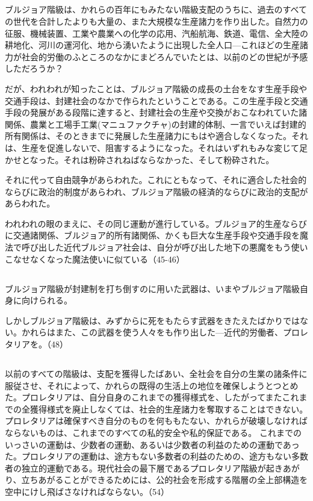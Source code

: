 \subsection{}



ブルジョア階級は、かれらの百年にもみたない階級支配のうちに、過去のすべての世代を合計したよりも大量の、また大規模な生産諸力を作り出した。自然力の征服、機械装置、工業や農業への化学の応用、汽船航海、鉄道、電信、全大陸の耕地化、河川の運河化、地から湧いたように出現した全人口{\——}これほどの生産諸力が社会的労働のふところのなかにまどろんでいたとは、以前のどの世紀が予感しただろうか？

だが、われわれが知ったことは、ブルジョア階級の成長の土台をなす生産手段や交通手段は、封建社会のなかで作られたということである。この生産手段と交通手段の発展がある段階に達すると、封建社会の生産や交換がおこなわれていた諸関係、農業と工場手工業(マニュファクチャ)の封建的体制、一言でいえば封建的所有関係は、そのときまでに発展した生産諸力にもはや適合しなくなった。それは、生産を促進しないで、阻害するようになった。それはいずれもみな変じて足かせとなった。それは粉砕されねばならなかった、そして粉砕された。

それに代って自由競争があらわれた。これにともなって、それに適合した社会的ならびに政治的制度があらわれ、ブルジョア階級の経済的ならびに政治的支配があらわれた。

われわれの眼のまえに、その同じ運動が進行している。ブルジョア的生産ならびに交通諸関係、ブルジョア的所有諸関係、かくも巨大な生産手段や交通手段を魔法で呼び出した近代ブルジョア社会は、自分が呼び出した地下の悪魔をもう使いこなせなくなった魔法使いに似ている（45-46）


\subsection{}


ブルジョア階級が封建制を打ち倒すのに用いた武器は、いまやブルジョア階級自身に向けられる。

しかしブルジョア階級は、みずからに死をもたらす武器をきたえたばかりではない。かれらはまた、この武器を使う人々をも作り出した{\——}近代的労働者、プロレタリアを。（48）

\subsection{}


以前のすべての階級は、支配を獲得したばあい、全社会を自分の生業の諸条件に服従させ、それによって、かれらの既得の生活上の地位を確保しようとつとめた。プロレタリアは、自分自身のこれまでの獲得様式を、したがってまたこれまでの全獲得様式を廃止しなくては、社会的生産諸力を奪取することはできない。プロレタリアは確保すべき自分のものを何ももたない、かれらが破壊しなければならないものは、これまでのすべての私的安全や私的保証である。
これまでのいっさいの運動は、少数者の運動、あるいは少数者の利益のための運動であった。プロレタリアの運動は、途方もない多数者の利益のための、途方もない多数者の独立的運動である。現代社会の最下層であるプロレタリア階級が起きあがり、立ちあがることができるためには、公的社会を形成する階層の全上部構造を空中にけし飛ばさなければならない。（54）

